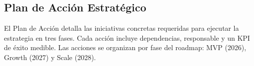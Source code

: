 ﻿\documentclass[11pt, letterpaper]{article}
\begin{document}

\subsection{Plan de Acción Estratégico}



El Plan de Acción detalla las iniciativas concretas requeridas para ejecutar la estrategia en tres fases. Cada acción incluye dependencias, responsable y un KPI de éxito medible. Las acciones se organizan por fase del roadmap: MVP (2026), Growth (2027) y Scale (2028).



\small

\setlength{\LTleft}{0pt}

\setlength{\LTright}{0pt}
\end{document}
